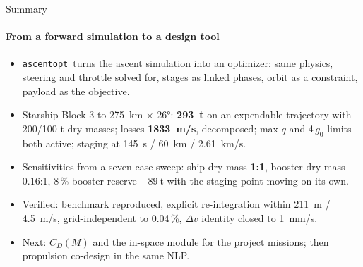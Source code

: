\documentclass[aspectratio=169,10pt]{beamer}
\providecommand{\dv}{\Delta v}\providecommand{\gz}{g_0}\providecommand{\pc}{p_c}\providecommand{\dd}{\mathrm{d}}\providecommand{\eps}{\varepsilon}
\newcommand{\tool}{\texttt{ascentopt}}
\begin{document}
\begin{frame}{Summary}
  \framesubtitle{From a forward simulation to a design tool}
  \begin{itemize}\setlength{\itemsep}{5pt}
    \item \tool\ turns the ascent simulation into an optimizer: same physics, steering and throttle solved for, stages as linked phases, orbit as a constraint, payload as the objective.
    \item Starship Block 3 to \SI{275}{km} $\times$ \ang{26}: \textbf{\SI{293}{\tonne}} on an expendable trajectory with 200/100 t dry masses; losses \textbf{\SI{1833}{m/s}}, decomposed; max-$q$ and 4\,$\gz$ limits both active; staging at \SI{145}{s} / \SI{60}{km} / \SI{2.61}{km/s}.
    \item Sensitivities from a seven-case sweep: ship dry mass \textbf{1:1}, booster dry mass 0.16:1, 8\,\% booster reserve $-\SI{89}{\tonne}$ with the staging point moving on its own.
    \item Verified: benchmark reproduced, explicit re-integration within \SI{211}{m} / \SI{4.5}{m/s}, grid-independent to 0.04\,\%, $\dv$ identity closed to \SI{1}{mm/s}.
    \item Next: $C_D(M)$ and the in-space module for the project missions; then propulsion co-design in the same NLP.
  \end{itemize}
\end{frame}
\end{document}
